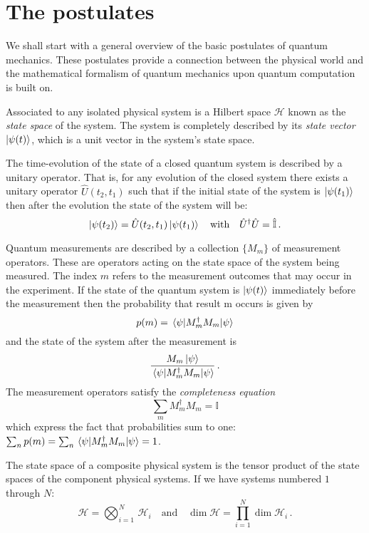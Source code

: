 \section{The postulates}
We shall start with a general overview of the basic postulates of quantum mechanics. These postulates provide a connection between the physical world and the mathematical formalism of quantum mechanics upon quantum computation is built on.
\begin{postulate}\label{postulate:1}
Associated to any isolated physical system is a Hilbert space $\mathcal{H}$ known as the \emph{state space} of the
system. The system is completely described by its \emph{state vector} $\ket{\psi(t)}$, which is a unit
vector in the system’s state space.
\end{postulate}
\begin{postulate}\label{postulate:2}
The time-evolution of the state of a closed quantum system is described by a
unitary operator. That is, for any evolution of the closed system there exists
a unitary operator $\widehat{U}(t_2,t_1)$ such that if the initial state of the system is $\ket{\psi(t_1)}$ then
after the evolution the state of the system will be:
\begin{equation*}
    \ket{\psi(t_2)} = \hat{U}(t_2,t_1) \ket{\psi(t_1)} \quad \text{with} \quad \hat{U}^\dagger\hat{U} = \hat{\mathbb{I}}\,.
\end{equation*}
\end{postulate}
\begin{postulate}
Quantum measurements are described by a collection $\{M_m\}$ of
measurement operators. These are operators acting on the state space of the
system being measured. The index $m$ refers to the measurement outcomes that
may occur in the experiment. If the state of the quantum system is $\ket{\psi(t)}$
immediately before the measurement then the probability that result m occurs is given by
\begin{equation*}
    p(m) = \expval{M^\dagger_m M_m}{\psi}
\end{equation*}
and the state of the system after the measurement is
\begin{equation*}
    \frac{M_m\ket{\psi}}{\expval{M^\dagger_m M_m}{\psi}}\,.
\end{equation*}
The measurement operators satisfy the \emph{completeness equation}
\begin{equation*}
    \sum_m M_m^\dagger M_m = \mathbb{I}
\end{equation*}
which express the fact that probabilities sum to one: $\sum_n p(m) = \sum_n \expval{M^\dagger_m M_m}{\psi} = 1$.
\end{postulate}
\begin{postulate}\label{postulate:4}
The state space of a composite physical system is the tensor product
of the state spaces of the component physical systems. If we have systems numbered $1$ through $N$:
\begin{equation*}
   \mathcal{H} = \bigotimes_{i=1}^{N}\,\mathcal{H}_i \quad  \text{and} \quad \dim\mathcal{H} = \prod_{i=1}^N \dim\mathcal{H}_i\,.
\end{equation*}
\end{postulate}